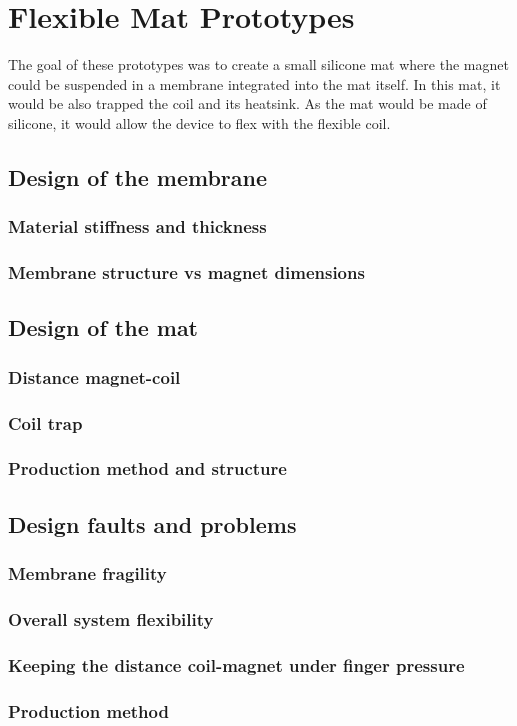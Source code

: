 \section{Flexible Mat Prototypes}
\label{sec: Flexible_Mat_Prototypes}
The goal of these prototypes was to create a small silicone mat where the magnet could be suspended in a membrane integrated into the mat itself.
In this mat, it would be also trapped the coil and its heatsink.
As the mat would be made of silicone, it would allow the device to flex with the flexible coil.

\subsection{Design of the membrane}

\subsubsection{Material stiffness and thickness}

\subsubsection{Membrane structure vs magnet dimensions}


\subsection{Design of the mat}

\subsubsection{Distance magnet-coil}

\subsubsection{Coil trap}

\subsubsection{Production method and structure}


\subsection{Design faults and problems}

\subsubsection{Membrane fragility}

\subsubsection{Overall system flexibility}

\subsubsection{Keeping the distance coil-magnet under finger pressure}

\subsubsection{Production method}